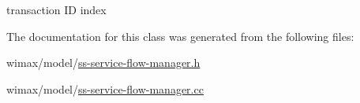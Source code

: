 transaction ID index 



The documentation for this class was generated from the following files\+:\begin{DoxyCompactItemize}
\item 
wimax/model/\hyperlink{ss-service-flow-manager_8h}{ss-\/service-\/flow-\/manager.\+h}\item 
wimax/model/\hyperlink{ss-service-flow-manager_8cc}{ss-\/service-\/flow-\/manager.\+cc}\end{DoxyCompactItemize}

